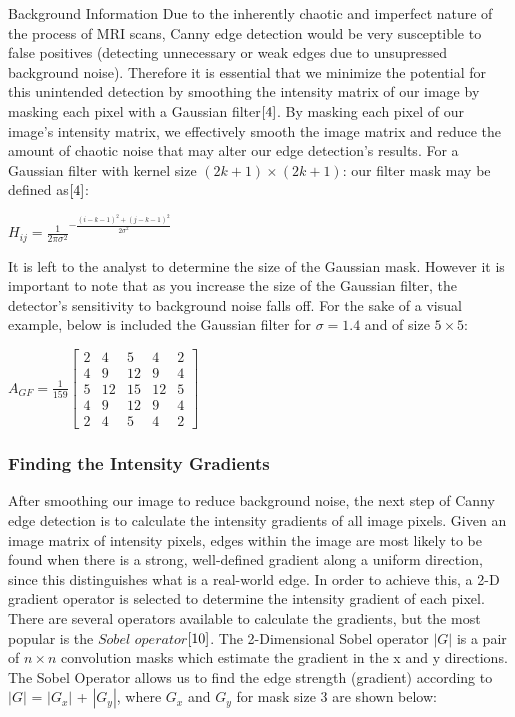 \documentclass[a4paper,12pt]{article}
\begin{document}
\begin{section}{Background Information}
Due to the inherently chaotic and imperfect nature of the process of MRI scans, Canny edge detection would be very susceptible to false positives (detecting unnecessary or weak edges due to unsupressed background noise). Therefore it is essential that we minimize the potential for this unintended detection by smoothing the intensity matrix of our image by masking each pixel with a Gaussian filter$\cite{4}$.%
By masking each pixel of our image's intensity matrix, we effectively smooth the image matrix and reduce the amount of chaotic noise that may alter our edge detection's results. For a Gaussian filter with kernel size $(2k+1)\times(2k+1)$: our filter mask may be defined as$\cite{4}$:\\%
\begin{center}
$H_{ij} = \frac{1}{2\pi\sigma^{2}}^{-\frac{(i-k-1)^2+(j-k-1)^2}{2\sigma^2}}$
\end{center}

It is left to the analyst to determine the size of the Gaussian mask.
However it is important to note that as you increase the size of the Gaussian filter, the detector's sensitivity to background noise falls off.
For the sake of a visual example, below is included the Gaussian filter for $\sigma = 1.4$ and of size $5\times5$:\\

\singlespacing
\begin{center}
$A_{GF} = \frac{1}{159}\begin{bmatrix}
	2	&	4	&	5	&	4	&	2\\
	4	&	9	&	{12}	&	9	&	4\\
	5	&	{12}	&	{15}	&	{12}	&	5\\
	4       &       9       &       {12}    &       9       &       4\\
	2       &       4       &       5       &       4       &       2
\end{bmatrix}$
\end{center}
\doublespacing

\subsubsection{Finding the Intensity Gradients}

After smoothing our image to reduce background noise, the next step of Canny edge detection is to calculate the intensity gradients of all image pixels. Given an image matrix of intensity pixels, edges within the image are most likely to be found when there is a strong, well-defined gradient along a uniform direction, since this distinguishes what is a real-world edge. In order to achieve this, a 2-D gradient operator is selected to determine the intensity gradient of each pixel. There are several operators available to calculate the gradients, but the most popular is the $Sobel$ $operator$$\cite{10}$.%
The 2-Dimensional Sobel operator $|G|$ is a pair of $n\times n$ convolution masks which estimate the gradient in the x and y directions. The Sobel Operator allows us to find the edge strength (gradient) according to $|G|$ = $|G_x|$ + $|G_y|$, where $G_x$ and $G_y$ for mask size 3 are shown below:


\end{section}
\end{document}
